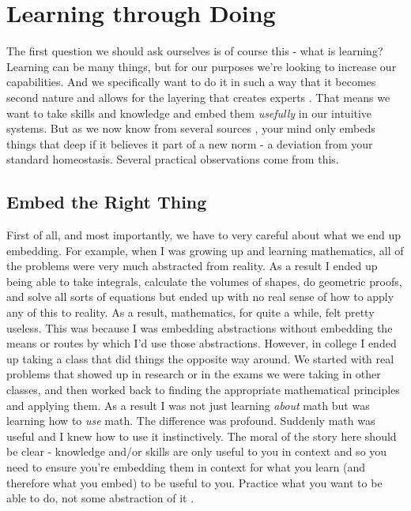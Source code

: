 \documentclass[11pt]{book}
\begin{document}
\section{Learning through Doing}
The first question we should ask ourselves is of course this - what is learning? Learning can be many things, but for our purposes we're looking to increase our capabilities. And we specifically want to do it in such a way that it becomes second nature and allows for the layering that creates experts \cite{ericsson}. That means we want to take skills and knowledge and embed them \textit{usefully} in our intuitive systems. But as we now know from several sources \cite{duhigg} \cite{ericsson}, your mind only embeds things that deep if it believes it part of a new norm - a deviation from your standard homeostasis. Several practical observations come from this.
\newline

\subsection{Embed the Right Thing}

First of all, and most importantly, we have to very careful about what we end up embedding. For example, when I was growing up and learning mathematics, all of the problems were very much abstracted from reality. As a result I ended up being able to take integrals, calculate the volumes of shapes, do geometric proofs, and solve all sorts of equations but ended up with no real sense of how to apply any of this to reality. As a result, mathematics, for quite a while, felt pretty useless. This was because I was embedding abstractions without embedding the means or routes by which I'd use those abstractions. However, in college I ended up taking a class that did things the opposite way around. We started with real problems that showed up in research or in the exams we were taking in other classes, and then worked back to finding the appropriate mathematical principles and applying them. As a result I was not just learning \textit{about} math but was learning how to \textit{use} math. The difference was profound. Suddenly math was useful and I knew how to use it instinctively. The moral of the story here should be clear - knowledge and/or skills are only useful to you in context and so you need to ensure you're embedding them in context for what you learn (and therefore what you embed) to be useful to you. Practice what you want to be able to do, not some abstraction of it \cite{stick}.
\newline
\end{document}
